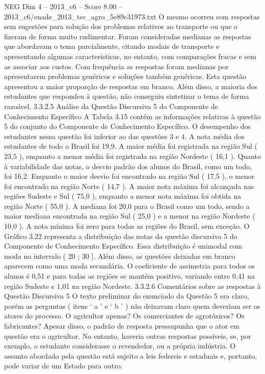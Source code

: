 \begin{textsample}{NEG Dim 4 – 2013\_c6 – Score 8.00 – 2013\_c6/enade\_2013\_tec\_agro\_5e89c31973.txt}
O mesmo ocorreu com respostas sem sugestões para solução dos problemas relativos ao transporte ou que o fizeram de forma muito rudimentar.
Foram consideradas medianas as respostas que abordavam o tema parcialmente, citando modais de transporte e apresentando algumas características, no entanto, com comparações fracas e sem as associar aos custos.
Com frequência as respostas foram medianas por apresentarem problemas genéricos e soluções também genéricas.
Esta questão apresentou a maior proporção de respostas em branco.
Além disso, a maioria dos estudantes que respondeu à questão, não conseguiu sintetizar o tema de forma razoável. 3.3.2.5 Análise da Questão Discursiva 5 do Componente de Conhecimento Específico A Tabela 3.15 contém as informações relativas à questão 5 do conjunto do Componente de Conhecimento Específico.
O desempenho dos estudantes nessa questão foi inferior ao das questões 3 e 4.
A nota média dos estudantes de todo o Brasil foi 19,9.
A maior média foi registrada na região Sul ( 23,5 ), enquanto a menor média foi registrada na região Nordeste ( 16,1 ).
Quanto à variabilidade das notas, o desvio padrão dos alunos do Brasil, como um todo, foi 16,2.
Enquanto o maior desvio foi encontrado na região Sul ( 17,5 ), o menor foi encontrado na região Norte ( 14,7 ).
A maior nota máxima foi alcançada nas regiões Sudeste e Sul ( 75,0 ), enquanto a menor nota máxima foi obtida na região Norte ( 55,0 ).
A mediana foi 20,0 para o Brasil como um todo, sendo a maior mediana encontrada na região Sul ( 25,0 ) e a menor na região Nordeste ( 10,0 ).
A nota mínima foi zero para todas as regiões do Brasil, sem exceção.
O Gráfico 3.22 representa a distribuição das notas da questão discursiva 5 do Componente de Conhecimento Específico.
Essa distribuição é unimodal com moda no intervalo ( 20 ; 30 ].
Além disso, as questões deixadas em branco aparecem como uma moda secundária.
O coeficiente de assimetria para todos os alunos é 0,51 e para todas as regiões se mantém positivo, variando entre 0,41 na região Sudeste e 1,01 na região Nordeste. 3.3.2.6 Comentários sobre as respostas à Questão Discursiva 5 O texto preliminar do enunciado da Questão 5 era claro, porém as perguntas ( itens ‘ a ’ e ‘ b ’ ) não deixavam claro quem deveriam ser os atores do processo.
O agricultor apenas?
Os comerciantes de agrotóxicos?
Os fabricantes?
Apesar disso, o padrão de resposta pressupunha que o ator em questão era o agricultor.
No entanto, haveria outras respostas possíveis, se, por exemplo, o estudante considerasse o revendedor, ou a própria indústria.
O assunto abordado pela questão está sujeito a leis federeis e estaduais e, portanto, pode variar de um Estado para outro.

\end{textsample}
